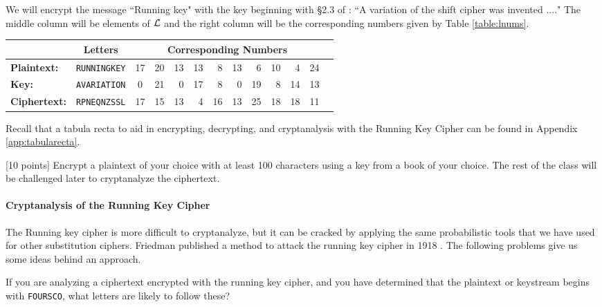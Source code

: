 \begin{example}
We will encrypt the message ``Running key" with the key beginning with \S 2.3 of \cite {tw}: ``A variation of the shift cipher was invented ...." The middle column will be elements of $\mathcal{L}$ and the right column will be the corresponding numbers given by Table \ref{table:lnums}.

\begin{center}
\noindent\begin{tabular}{lccrrrrrrrrrr}
					& {\bf Letters} & \multicolumn{10}{c}{{\bf Corresponding Numbers}}\\
\hline
{\bf Plaintext:} 	& {\tt RUNNINGKEY} & 17 & 20 & 13 & 13 & 8 & 13 & 6 & 10 & 4 & 24\\
{\bf Key:}			& {\tt AVARIATION} 	&  0 & 21 &   0 & 17 & 8 & 0 & 19 & 8 & 14 & 13 \\
{\bf Ciphertext:}	& {\tt RPNEQNZSSL} & 17 & 15 & 13 & 4 & 16 & 13 & 25 & 18 & 18 & 11\\
\end{tabular}
\end{center}
\end{example}

Recall that a tabula recta to aid in encrypting, decrypting, and cryptanalysis with the Running Key Cipher can be found in Appendix \ref{app:tabularecta}.

\begin{problem}
\label{prob:book-enc} [10 points]
Encrypt a plaintext of your choice with at least 100 characters using a key from a book of your choice. The rest of the class will be challenged later to cryptanalyze the ciphertext.
\end{problem}

	\paragraph*{Cryptanalysis of the Running Key Cipher}

The Running key cipher is more difficult to cryptanalyze, but it can be cracked by applying the same probabilistic tools that we have used for other substitution ciphers. Friedman published a method to attack the running key cipher in 1918 \cite{kahn, schneier}. The following problems give us some ideas behind an approach.

\begin{problem}  [5 points]
If you are analyzing a ciphertext encrypted with the running key cipher, and you have determined that the plaintext or keystream begins with {\tt FOURSCO}, what letters are likely to follow these?
\end{problem}

